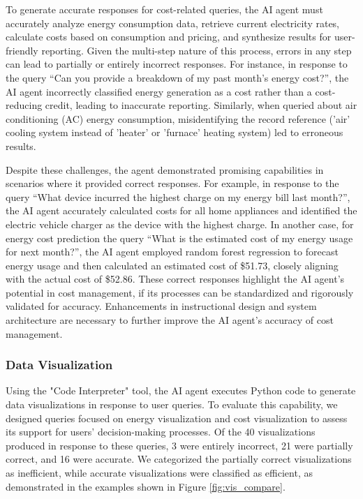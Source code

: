 \documentclass[final,3p,times]{elsarticle}
\begin{document}
To generate accurate responses for cost-related queries, the AI agent must accurately analyze energy consumption data, retrieve current electricity rates, calculate costs based on consumption and pricing, and synthesize results for user-friendly reporting. Given the multi-step nature of this process, errors in any step can lead to partially or entirely incorrect responses. For instance, in response to the query “Can you provide a breakdown of my past month's energy cost?”, the AI agent incorrectly classified energy generation as a cost rather than a cost-reducing credit, leading to inaccurate reporting. Similarly, when queried about air conditioning (AC) energy consumption, misidentifying the record reference ('air' cooling system instead of 'heater' or 'furnace' heating system) led to erroneous results.

Despite these challenges, the agent demonstrated promising capabilities in scenarios where it provided correct responses. For example, in response to the query “What device incurred the highest charge on my energy bill last month?”, the AI agent accurately calculated costs for all home appliances and identified the electric vehicle charger as the device with the highest charge. In another case, for energy cost prediction the query “What is the estimated cost of my energy usage for next month?”, the AI agent employed random forest regression to forecast energy usage and then calculated an estimated cost of \$51.73, closely aligning with the actual cost of \$52.86. These correct responses highlight the AI agent's potential in cost management, if its processes can be standardized and rigorously validated for accuracy. Enhancements in instructional design and system architecture are necessary to further improve the AI agent's accuracy of cost management.

\subsubsection{Data Visualization}

Using the "Code Interpreter" tool, the AI agent executes Python code to generate data visualizations in response to user queries. To evaluate this capability, we designed queries focused on energy visualization and cost visualization to assess its support for users' decision-making processes. Of the 40 visualizations produced in response to these queries, 3 were entirely incorrect, 21 were partially correct, and 16 were accurate. We categorized the partially correct visualizations as inefficient, while accurate visualizations were classified as efficient, as demonstrated in the examples shown in Figure \ref{fig:vis_compare}.
\end{document}
